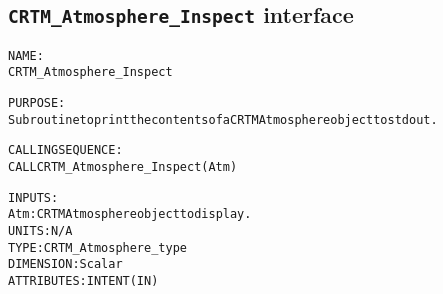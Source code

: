 \subsection{\texttt{CRTM\_Atmosphere\_Inspect} interface}
  \label{sec:CRTM_Atmosphere_Inspect_interface}
  \begin{alltt}
 
  NAME:
        CRTM_Atmosphere_Inspect
 
  PURPOSE:
        Subroutine to print the contents of a CRTM Atmosphere object to stdout.
 
  CALLING SEQUENCE:
        CALL CRTM_Atmosphere_Inspect( Atm )
 
  INPUTS:
        Atm:  CRTM Atmosphere object to display.
              UNITS:      N/A
              TYPE:       CRTM_Atmosphere_type
              DIMENSION:  Scalar
              ATTRIBUTES: INTENT(IN)
 
  \end{alltt}
